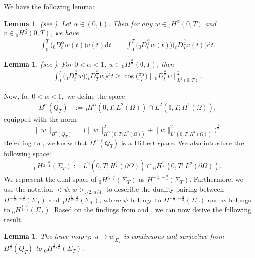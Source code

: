 \documentclass[a4paper,12pt,reqno,natbib]{amsart}
\newtheorem{lemma}[theorem]{Lemma}
\newcommand{\dt} {\displaystyle\mathrm{d}t}
\begin{document}
We have the following lemma:
\begin{lemma}\label{lemma24}(see \cite[Lemma 2.6]{li2009space}). Let $\alpha\in(0,1)$. Then for any $w\in {}_0H^{\alpha}(0,T)$ and $v\in {}_0H^{\frac{\alpha}{2}}(0,T)$, we have
\begin{align*}
    \int_0^T \Big({}_0D^\alpha _{t} w(t)\Big) v(t)\dt &= \int_0^T \Big({}_0D^{\frac{\alpha}{2}} _{t} w(t)\Big)\Big( {}_tD^{\frac{\alpha}{2}}_T v(t)\Big)\dt.
\end{align*}
\end{lemma}
\begin{lemma} (see \cite[Lemma 2.2]{li2009space}). \label{cosinus}
For $0<\alpha<1$, $w\in {}_0H^\frac{\alpha}{2}(0,T)$, then
\begin{align*}
 \int_0^T \Big({}_0D^{\frac{\alpha}{2}} _{t} w\Big)\Big( {}_tD^{\frac{\alpha}{2}}_T w\Big)\dt \geq \cos\Big(\frac{\pi\alpha}{2}\Big)\|{}_0D^{\frac{\alpha}{2}}_t w\|_{L^2(0,T)}^2.
\end{align*}
\end{lemma}
Now, for $0<\alpha<1,$ we define the space
\begin{eqnarray*}
    B^\alpha(Q_T)&:={}_0H^{\alpha}(0,T;L^2(\Omega)) \cap L^2(0,T;H^1(\Omega)),
\end{eqnarray*}
equipped with the norm
\begin{equation*}
    \|w\|_{B^\alpha(Q_T)} =\Big( \|w\|^2_{H^\alpha(0,T;L^2(\Omega))} + \|w\|^2_{L^2(0,T;H^1(\Omega))}
\Big) ^\frac{1}{2}.
\end{equation*}
Referring to \cite{li2009space}, we know that $B^\alpha(Q_T)$ is a Hilbert space. We also introduce the following space:
\begin{align}
\label{H001}  {}_0 H^{\frac{1}{2},\frac{\alpha}{4}}\left(\Sigma_{T}\right):=L^{2}(0, T ; H^{\frac{1}{2}}(\partial\Omega)) \cap   {}_0H^{\frac{\alpha}{4}}\left(0, T ; L^{2}(\partial\Omega)\right).
\end{align}
We represent the dual space of ${}_0 H^{\frac{1}{2},\frac{\alpha}{4}}\left(\Sigma_{T}\right)$ as $H^{-\frac{1}{2},-\frac{\alpha}{4}}\left(\Sigma_{T}\right)$. Furthermore, we use the notation $\Big<\psi,w\Big>_{1/2,\alpha/4}$ to describe the duality pairing between $H^{-\frac{1}{2},-\frac{\alpha}{4}}\left(\Sigma_{T}\right)$ and ${}_0 H^{\frac{1}{2},\frac{\alpha}{4}}\left(\Sigma_{T}\right)$, where $\psi$ belongs to $H^{-\frac{1}{2},-\frac{\alpha}{4}}\left(\Sigma_{T}\right)$ and $w$ belongs to ${}_0 H^{\frac{1}{2},\frac{\alpha}{4}}\left(\Sigma_{T}\right).$
Based on the findings from \cite[Theorem 4.2]{lions2012non} and \cite[Theorem 2.1]{lionsv2}, we can now derive the following result.
\begin{lemma} \label{lm2}
The trace map $\gamma:\; u \longmapsto u|_{\Sigma_T} $ is continuous and surjective from $B^ \frac{\alpha}{2} (Q_T)$ to ${}_0H^{\frac{1}{2}, \frac{\alpha}{4} }(\Sigma_T)$.
\end{lemma}
\end{document}
